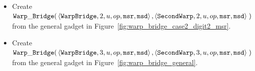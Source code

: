 \begin{itemize}
\begin{itemize}
            \item Create
            $\begin{aligned}[t]
                {\tt Warp\_Bridge}(& \left\langle {\tt WarpBridge}, 2, u, op, {\tt msr}, {\tt msd} \right\rangle,
                              \left\langle {\tt SecondWarp}, 2, u, op, {\tt msr}, {\tt msd} \right\rangle \;)
            \end{aligned}$ \\ from the general gadget in Figure~\ref{fig:warp_bridge_case2_digit2_msr}.
            \vspace{.5cm}

            \item Create
            $\begin{aligned}[t]
                {\tt Warp\_Bridge}(& \left\langle {\tt WarpBridge}, 3, u, op, {\tt msr}, {\tt msd} \right\rangle,
                              \left\langle {\tt SecondWarp}, 3, u, op, {\tt msr}, {\tt msd} \right\rangle \;)
            \end{aligned}$ \\ from the general gadget in Figure~\ref{fig:warp_bridge_general}.
            \vspace{.5cm}
        \end{itemize}


\end{itemize}
